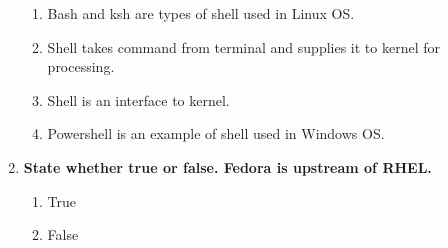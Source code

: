 \begin{flushleft}
\begin{enumerate}
\begin{enumerate}[label=(\alph*)]
			\item Bash and ksh are types of shell used in Linux OS.  %
			\item Shell takes command from terminal and supplies it to kernel for processing.  %
			\item Shell is an interface to kernel. %
			\item Powershell is an example of shell used in Windows OS.  %
		\end{enumerate}
		\bigskip
		\bigskip
		\item \textbf{State whether true or false. Fedora is upstream of RHEL.}
		\begin{enumerate}[label=(\alph*)]
			\item True   %
			\item False   
		\end{enumerate}
	\end{enumerate}

	
\end{flushleft}
\newpage

